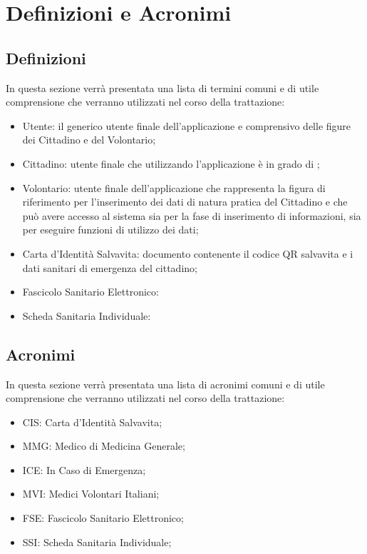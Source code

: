 \documentclass[12pt,a4paper,twoside,openright,titlepage]{book}
\begin{document}
%

%



%

\chapter*{Definizioni e Acronimi}
\section*{Definizioni}
In questa sezione verrà presentata una lista di termini comuni e di utile comprensione che verranno utilizzati nel corso della trattazione:
\begin{itemize}
\item Utente: il generico utente finale dell'applicazione e comprensivo delle figure dei Cittadino e del Volontario;
\item Cittadino: utente finale che utilizzando l'applicazione è in grado di ;
\item Volontario: utente finale dell'applicazione che rappresenta la figura di riferimento per l'inserimento dei dati di natura pratica del Cittadino e che può avere accesso al sistema sia per la fase di inserimento di informazioni, sia per eseguire funzioni di utilizzo dei dati;
\item Carta d'Identità Salvavita: documento contenente il codice QR salvavita e i dati sanitari di emergenza del cittadino;
\item Fascicolo Sanitario Elettronico:
\item Scheda Sanitaria Individuale:
\end{itemize}

\section*{Acronimi}
In questa sezione verrà presentata una lista di acronimi comuni e di utile comprensione che verranno utilizzati nel corso della trattazione:
\begin{itemize}
\item CIS: Carta d'Identità Salvavita;
\item MMG: Medico di Medicina Generale;
\item ICE: In Caso di Emergenza;
\item MVI: Medici Volontari Italiani;
\item FSE: Fascicolo Sanitario Elettronico;
\item SSI: Scheda Sanitaria Individuale;
\end{itemize}
\end{document}
